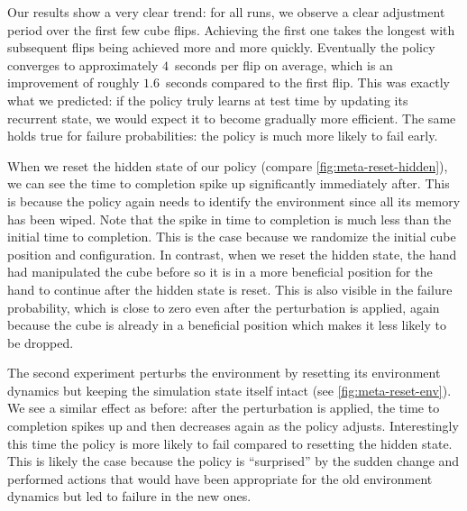 Our results show a very clear trend: for all runs, we observe a clear adjustment period over the first few cube flips. Achieving the first one takes the longest with subsequent flips being achieved more and more quickly. Eventually the policy converges to approximately $4$~seconds per flip on average, which is an improvement of roughly $1.6$~seconds compared to the first flip. This was exactly what we predicted: if the policy truly learns at test time by updating its recurrent state, we would expect it to become gradually more efficient. The same holds true for failure probabilities: the policy is much more likely to fail early.

When we reset the hidden state of our policy (compare \autoref{fig:meta-reset-hidden}), we can see the time to completion spike up significantly immediately after. This is because the policy again needs to identify the environment since all its memory has been wiped. Note that the spike in time to completion is much less than the initial time to completion. This is the case because we randomize the initial cube position and configuration. In contrast, when we reset the hidden state, the hand had manipulated the cube before so it is in a more beneficial position for the hand to continue after the hidden state is reset. This is also visible in the failure probability, which is close to zero even after the perturbation is applied, again because the cube is already in a beneficial position which makes it less likely to be dropped.

The second experiment perturbs the environment by resetting its environment dynamics but keeping the simulation state itself intact (see \autoref{fig:meta-reset-env}). We see a similar effect as before: after the perturbation is applied, the time to completion spikes up and then decreases again as the policy adjusts. Interestingly this time the policy is more likely to fail compared to resetting the hidden state. This is likely the case because the policy is ``surprised'' by the sudden change and performed actions that would have been appropriate for the old environment dynamics but led to failure in the new ones.


